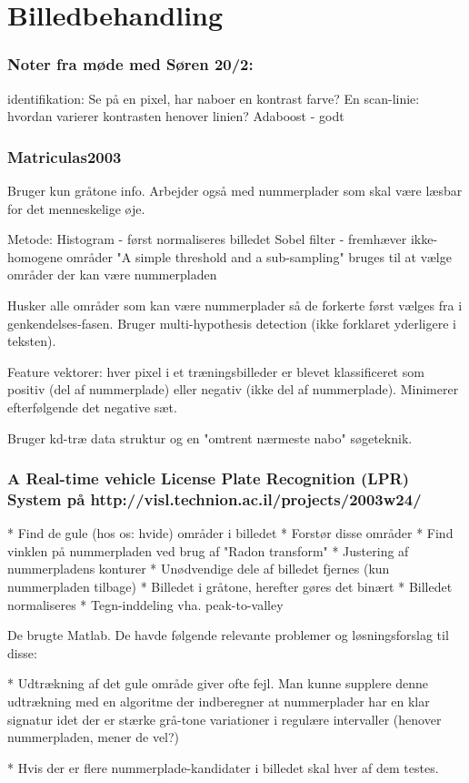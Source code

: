 \section{Billedbehandling}


\subsubsection*{Noter fra møde med Søren 20/2:}
identifikation: Se på en pixel, har naboer en kontrast farve?
En scan-linie: hvordan varierer kontrasten henover linien?
Adaboost - godt

\subsubsection*{Matriculas2003}
Bruger kun gråtone info. Arbejder også med nummerplader som skal være læsbar for det menneskelige øje.

Metode:
Histogram - først normaliseres billedet
Sobel filter - fremhæver ikke-homogene områder
"A simple threshold and a sub-sampling" bruges til at vælge områder der kan være nummerpladen

Husker alle områder som kan være nummerplader så de forkerte først vælges fra i genkendelses-fasen. Bruger multi-hypothesis detection (ikke forklaret yderligere i teksten).

Feature vektorer: hver pixel i et træningsbilleder er blevet klassificeret som positiv (del af nummerplade) eller negativ (ikke del af nummerplade). Minimerer efterfølgende det negative sæt.

Bruger kd-træ data struktur og en "omtrent nærmeste nabo" søgeteknik.

\subsubsection*{A Real-time vehicle License Plate Recognition (LPR) System på http://visl.technion.ac.il/projects/2003w24/}

* Find de gule (hos os: hvide) områder i billedet
* Forstør disse områder
* Find vinklen på nummerpladen ved brug af "Radon transform"
* Justering af nummerpladens konturer
* Unødvendige dele af billedet fjernes (kun nummerpladen tilbage)
* Billedet i gråtone, herefter gøres det binært
* Billedet normaliseres
* Tegn-inddeling vha. peak-to-valley

De brugte Matlab. De havde følgende relevante problemer og løsningsforslag til disse:

* Udtrækning af det gule område giver ofte fejl. Man kunne supplere denne udtrækning med en algoritme der indberegner at nummerplader har en klar signatur idet der er stærke grå-tone variationer i regulære intervaller (henover nummerpladen, mener de vel?)

* Hvis der er flere nummerplade-kandidater i billedet skal hver af dem testes.
